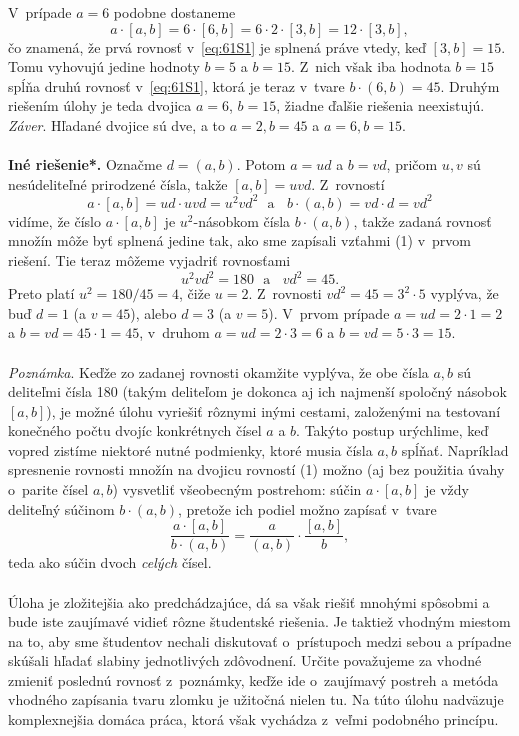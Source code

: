 {V~prípade $a = 6$ podobne dostaneme
$$a \cdot [a, b] = 6 \cdot [6, b] = 6 \cdot 2 \cdot [3, b] = 12 \cdot [3, b],$$
čo znamená, že prvá rovnosť v~\ref{eq:61S1} je splnená práve vtedy, keď $[3, b] = 15$. Tomu vyhovujú jedine hodnoty $b = 5$ a $b = 15$. Z~nich však iba hodnota $b = 15$ spĺňa druhú rovnosť v~\ref{eq:61S1}, ktorá je teraz v~tvare $b\cdot(6, b) = 45$. Druhým riešením úlohy je teda dvojica $a = 6$, $b = 15$, žiadne ďalšie riešenia neexistujú.\\
\textit{Záver}. Hľadané dvojice sú dve, a to $a = 2, b = 45$ a $a = 6, b = 15$.\\
\\
\textbf{Iné riešenie*.} Označme $d = (a, b)$. Potom $a = ud$ a $b = vd$, pričom $u, v$ sú nesúdeliteľné prirodzené čísla, takže $[a, b] = uvd$. Z~rovností
$$a \cdot [a, b] = ud \cdot uvd = u^2vd^2 \ \ \ \text{a} \ \ \ \ b \cdot (a, b) = vd \cdot d = vd^2$$
vidíme, že číslo $a \cdot [a, b]$ je $u^2$-násobkom čísla $b \cdot (a, b)$, takže zadaná rovnosť množín môže byť splnená jedine tak, ako sme zapísali vzťahmi (1) v~prvom riešení. Tie teraz môžeme vyjadriť rovnosťami
$$u^2vd^2= 180 \ \ \  \text{a} \ \ \ \ vd^2= 45.$$
Preto platí $u^2 =180/45= 4$, čiže $u = 2$. Z~rovnosti $vd^2 = 45 = 3^2 \cdot 5$ vyplýva, že buď $d = 1$ (a $v = 45$), alebo $d = 3$ (a $v = 5$). V~prvom prípade $a = ud = 2 \cdot 1 = 2$ a $b = vd = 45 \cdot 1 = 45$, v~druhom $a = ud = 2 \cdot 3 = 6$ a $b = vd = 5 \cdot 3 = 15$.\\
\\
\textit{Poznámka}. Keďže zo zadanej rovnosti okamžite vyplýva, že obe čísla $a, b$ sú deliteľmi čísla 180 (takým deliteľom je dokonca aj ich najmenší spoločný násobok $[a, b]$), je možné úlohu vyriešiť rôznymi inými cestami, založenými na testovaní konečného počtu dvojíc konkrétnych čísel $a$ a $b$. Takýto postup urýchlime, keď vopred zistíme niektoré nutné podmienky, ktoré musia čísla $a, b$ spĺňať. Napríklad spresnenie rovnosti množín na dvojicu rovností (1) možno (aj bez použitia úvahy o~parite čísel $a, b$) vysvetliť všeobecným postrehom: súčin $a \cdot [a, b]$ je vždy deliteľný súčinom $b \cdot (a, b)$, pretože ich
podiel možno zapísať v~tvare
$$ \frac{a \cdot [a, b]}{b \cdot (a, b)}=\frac{a}{(a, b)}\cdot\frac{[a, b]}{b},$$
teda ako súčin dvoch \textit{celých} čísel.\\
\\
\kom Úloha je zložitejšia ako predchádzajúce, dá sa však riešiť mnohými spôsobmi a bude iste zaujímavé vidieť rôzne študentské riešenia. Je taktiež vhodným miestom na to, aby sme študentov nechali diskutovať o~prístupoch medzi sebou a prípadne skúšali hľadať slabiny jednotlivých zdôvodnení. Určite považujeme za vhodné zmieniť poslednú rovnosť z~poznámky, keďže ide o~zaujímavý postreh a metóda vhodného zapísania tvaru zlomku je užitočná nielen tu. Na túto úlohu nadväzuje komplexnejšia domáca práca, ktorá však vychádza z~veľmi podobného princípu.\\
\\
}
